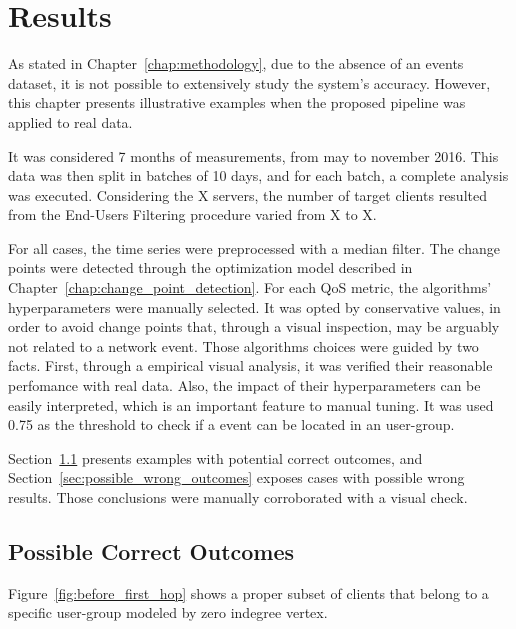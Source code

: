 \chapter{Results}
\label{chap:results}

As stated in Chapter~\ref{chap:methodology}, due to the absence of an events
dataset, it is not possible to extensively study the system's accuracy.
However, this chapter presents illustrative examples when the proposed pipeline
was applied to real data.

It was considered 7 months of measurements, from may to november 2016.
This data was then split in batches of 10 days, and for each batch,
a complete analysis was executed.
Considering the X servers, the number of target clients resulted from the
End-Users Filtering procedure varied from X to X.

For all cases, the time series were preprocessed with a median filter.
The change points were detected through the optimization model described in
Chapter~\ref{chap:change_point_detection}.
For each QoS metric, the algorithms' hyperparameters were manually selected.
It was opted by conservative values, in order to avoid change points that,
through a visual inspection, may be arguably not related to a network event.
Those algorithms choices were guided by two facts.
First, through a empirical visual analysis,
it was verified their reasonable perfomance with real data.
Also, the impact of their hyperparameters can be easily interpreted, which is
an important feature to manual tuning.
It was used 0.75 as the threshold to check if a event can be located in an
user-group.

Section~\ref{sec:possible_correct_outcomes} presents examples with potential
correct outcomes, and Section~\ref{sec:possible_wrong_outcomes} exposes
cases with possible wrong results. Those conclusions were manually corroborated
with a visual check.

\section{Possible Correct Outcomes}
\label{sec:possible_correct_outcomes}

Figure~\ref{fig:before_first_hop} shows a proper subset of clients that belong
to a specific user-group modeled by zero indegree vertex.

